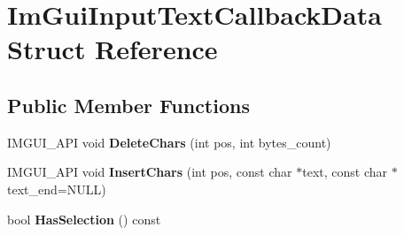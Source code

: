 \hypertarget{structImGuiInputTextCallbackData}{}\section{Im\+Gui\+Input\+Text\+Callback\+Data Struct Reference}
\label{structImGuiInputTextCallbackData}
\subsection*{Public Member Functions}
\begin{DoxyCompactItemize}
\item 
\mbox{\label{structImGuiInputTextCallbackData_ab5dc30d7edcf60efbd5bb8e677dab8bf}} 
I\+M\+G\+U\+I\+\_\+\+A\+PI void {\bfseries Delete\+Chars} (int pos, int bytes\+\_\+count)
\item 
\mbox{\label{structImGuiInputTextCallbackData_a9963937f48aba00466c2af404dad1e25}} 
I\+M\+G\+U\+I\+\_\+\+A\+PI void {\bfseries Insert\+Chars} (int pos, const char $\ast$text, const char $\ast$text\+\_\+end=N\+U\+LL)
\item 
\mbox{\label{structImGuiInputTextCallbackData_aae1b69a904053961be171d7f47ef430e}} 
bool {\bfseries Has\+Selection} () const
\end{DoxyCompactItemize}
